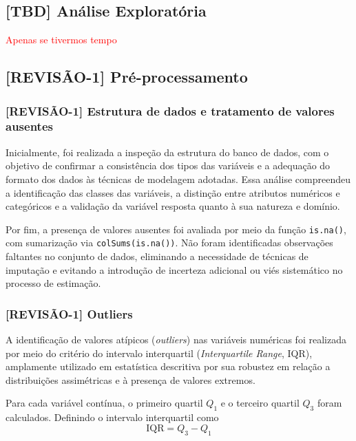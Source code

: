 \documentclass[
  brazilian,
  12pt,
  letterpaper,
  DIV=11,
  numbers=noendperiod]{scrartcl}
\newcommand{\red}[1]{\textcolor{red}{#1}}
\begin{document}
\subsection{{[}TBD{]} Análise
Exploratória}\label{tbd-anuxe1lise-exploratuxf3ria}

\red{Apenas se tivermos tempo}

\subsection{{[}REVISÃO-1{]}
Pré-processamento}\label{revisuxe3o-1-pruxe9-processamento}

\subsubsection{{[}REVISÃO-1{]} Estrutura de dados e tratamento de
valores
ausentes}\label{revisuxe3o-1-estrutura-de-dados-e-tratamento-de-valores-ausentes}

Inicialmente, foi realizada a inspeção da estrutura do banco de dados,
com o objetivo de confirmar a consistência dos tipos das variáveis e a
adequação do formato dos dados às técnicas de modelagem adotadas. Essa
análise compreendeu a identificação das classes das variáveis, a
distinção entre atributos numéricos e categóricos e a validação da
variável resposta quanto à sua natureza e domínio.

Por fim, a presença de valores ausentes foi avaliada por meio da função
\texttt{is.na()}, com sumarização via \texttt{colSums(is.na())}. Não
foram identificadas observações faltantes no conjunto de dados,
eliminando a necessidade de técnicas de imputação e evitando a
introdução de incerteza adicional ou viés sistemático no processo de
estimação.

\subsubsection{{[}REVISÃO-1{]} Outliers}\label{revisuxe3o-1-outliers}

A identificação de valores atípicos (\emph{outliers}) nas variáveis
numéricas foi realizada por meio do critério do intervalo interquartil
(\emph{Interquartile Range}, IQR), amplamente utilizado em estatística
descritiva por sua robustez em relação a distribuições assimétricas e à
presença de valores extremos.

Para cada variável contínua, o primeiro quartil \(Q_1\) e o terceiro
quartil \(Q_3\) foram calculados. Definindo o intervalo interquartil
como
\begin{equation}
\mathrm{IQR} = Q_3 - Q_1
\label{eq:iqr}
\end{equation}
\end{document}
